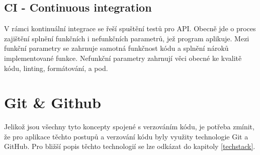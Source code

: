 \subsection{CI - Continuous integration}
V rámci kontinuální integrace se řeší spuštění testů pro API. Obecně jde o proces zajištění splnění funkčních i nefunkčních parametrů, jež program aplikuje. Mezi funkční parametry se zahrnuje samotná funkčnost kódu a splnění nároků implementované funkce. Nefunkční parametry zahrnují věci obecné ke kvalitě kódu, linting, formátování, a pod.

\section{Git \& Github}
Jelikož jsou všechny tyto koncepty spojené s verzováním kódu, je potřeba zmínit, že pro aplikace těchto postupů a verzování kódu byly využity technologie Git a GitHub. Pro bližší popis těchto technologií se lze odkázat do kapitoly \ref{techstack}.
